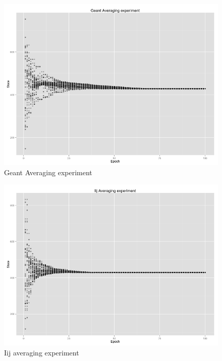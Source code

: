 \begin{figure}[h!]
    \begin{minipage}[t]{0.47\textwidth}
    \vspace{0pt}
    \includegraphics[width=\linewidth]{figures/Geant Averaging experiment.png}
    Geant Averaging experiment
    \end{minipage}
    \begin{minipage}[t]{0.47\textwidth}
    \vspace{0pt}
    \includegraphics[width=\linewidth]{figures/Iij averaging experiment.png}
    Iij averaging experiment
    \end{minipage}
    \caption{}
    \label{fig: result}
\end{figure}


